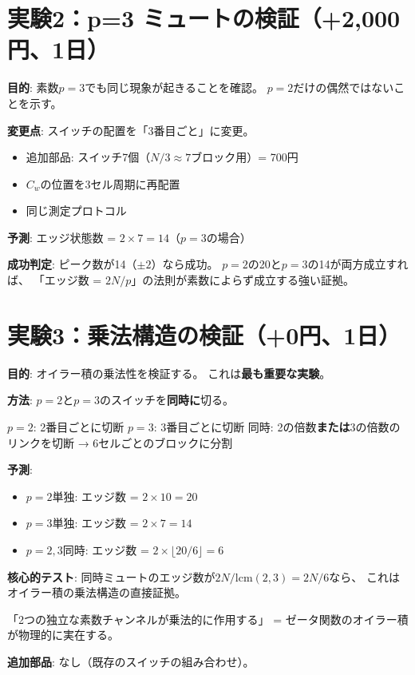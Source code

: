 \documentclass[12pt,a4paper]{article}
\begin{document}
\section{実験2：p=3 ミュートの検証（+2,000円、1日）}

\begin{nextbox}
\textbf{目的}: 素数$p=3$でも同じ現象が起きることを確認。
$p=2$だけの偶然ではないことを示す。

\textbf{変更点}: スイッチの配置を「3番目ごと」に変更。

\begin{itemize}
\item 追加部品: スイッチ7個（$N/3 \approx 7$ブロック用）= 700円
\item $C_w$の位置を3セル周期に再配置
\item 同じ測定プロトコル
\end{itemize}

\textbf{予測}: エッジ状態数 = $2 \times 7 = 14$（$p=3$の場合）

\textbf{成功判定}: ピーク数が14（$\pm 2$）なら成功。
$p=2$の20と$p=3$の14が両方成立すれば、
「エッジ数 = $2N/p$」の法則が素数によらず成立する強い証拠。
\end{nextbox}

\section{実験3：乗法構造の検証（+0円、1日）}

\begin{nextbox}
\textbf{目的}: オイラー積の乗法性を検証する。
これは\textbf{最も重要な実験}。

\textbf{方法}: $p=2$と$p=3$のスイッチを\textbf{同時に}切る。

$p=2$: 2番目ごとに切断
$p=3$: 3番目ごとに切断
同時: 2の倍数\textbf{または}3の倍数のリンクを切断
→ 6セルごとのブロックに分割

\textbf{予測}:
\begin{itemize}
\item $p=2$単独: エッジ数 = $2 \times 10 = 20$
\item $p=3$単独: エッジ数 = $2 \times 7 = 14$
\item $p=2,3$同時: エッジ数 = $2 \times \lfloor 20/6 \rfloor = 6$
\end{itemize}

\textbf{核心的テスト}:
同時ミュートのエッジ数が$2N/\mathrm{lcm}(2,3) = 2N/6$なら、
これはオイラー積の乗法構造の直接証拠。

「2つの独立な素数チャンネルが乗法的に作用する」
= ゼータ関数のオイラー積が物理的に実在する。

\textbf{追加部品}: なし（既存のスイッチの組み合わせ）。
\end{nextbox}
\end{document}
